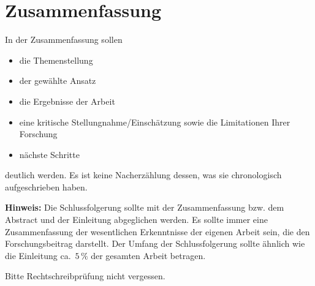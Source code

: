 
\section{Zusammenfassung} \label{zusammenfassung}

In der Zusammenfassung sollen
\begin{itemize}
	\item die Themenstellung
	\item der gewählte Ansatz
	\item die Ergebnisse der Arbeit
	\item eine kritische Stellungnahme/Einschätzung sowie die Limitationen Ihrer Forschung
	\item nächste Schritte
\end{itemize}
deutlich werden.
Es ist keine Nacherzählung dessen, was sie chronologisch aufgeschrieben haben.

\textbf{Hinweis:}
Die Schlussfolgerung sollte mit der Zusammenfassung bzw. dem Abstract und der Einleitung abgeglichen werden. Es sollte immer eine Zusammenfassung der wesentlichen Erkenntnisse der eigenen Arbeit sein, die den Forschungsbeitrag darstellt. Der Umfang der Schlussfolgerung sollte ähnlich wie die Einleitung ca.~$5\,\%$ der gesamten Arbeit betragen.


Bitte Rechtschreibprüfung nicht vergessen.